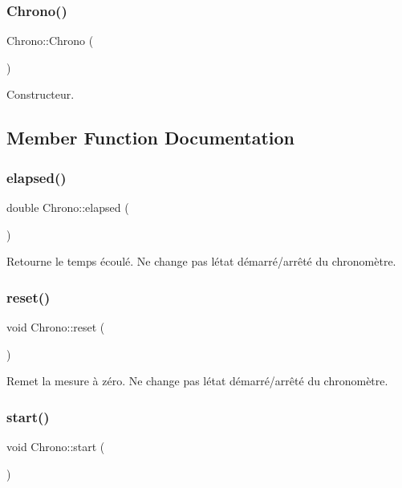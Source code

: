 \subsubsection{\texorpdfstring{Chrono()}{Chrono()}}
{\footnotesize\ttfamily Chrono\+::\+Chrono (\begin{DoxyParamCaption}{ }\end{DoxyParamCaption})}



Constructeur. 



\subsection{Member Function Documentation}
\mbox{\label{classChrono_aad4b00919a2eed1271259095a61b3096}} 
\subsubsection{\texorpdfstring{elapsed()}{elapsed()}}
{\footnotesize\ttfamily double Chrono\+::elapsed (\begin{DoxyParamCaption}{ }\end{DoxyParamCaption})}

Retourne le temps écoulé. Ne change pas l\textquotesingle{}état démarré/arrêté du chronomètre. \mbox{\label{classChrono_a027be23720616639bc610a98c53740ea}} 
\subsubsection{\texorpdfstring{reset()}{reset()}}
{\footnotesize\ttfamily void Chrono\+::reset (\begin{DoxyParamCaption}{ }\end{DoxyParamCaption})}

Remet la mesure à zéro. Ne change pas l\textquotesingle{}état démarré/arrêté du chronomètre. \mbox{\label{classChrono_a25fa21b48125a6a811638aa6b8dcdbe8}} 
\subsubsection{\texorpdfstring{start()}{start()}}
{\footnotesize\ttfamily void Chrono\+::start (\begin{DoxyParamCaption}{ }\end{DoxyParamCaption})}



